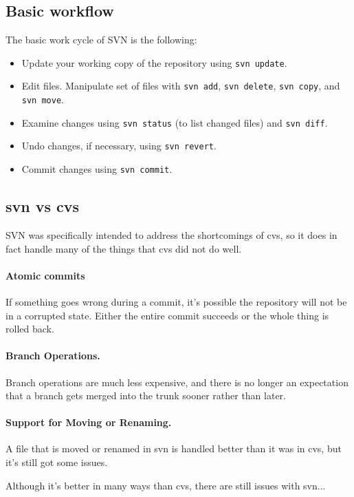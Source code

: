 \subsection*{Basic workflow}
The basic work cycle of SVN is the following:
\begin{itemize}
\item Update your working copy of the repository using {\tt svn update}.
\item Edit files. Manipulate set of files with {\tt svn add}, {\tt svn delete}, {\tt svn copy}, and {\tt svn move}.
\item Examine changes using {\tt svn status} (to list changed files)
  and {\tt svn diff}.
\item Undo changes, if necessary, using {\tt svn revert}.
\item Commit changes using {\tt svn commit}.
\end{itemize}

\subsection*{svn vs cvs}

SVN was specifically intended to address the shortcomings of cvs, so it does in fact handle many of the things that cvs did not do well.

\paragraph{Atomic commits} If something goes wrong during a commit, it's possible the repository will not be in a corrupted state. Either the entire commit succeeds or the whole thing is rolled back.

\paragraph{Branch Operations.} Branch operations are much less expensive, and there is no longer an expectation that a branch gets merged into the trunk sooner rather than later.

\paragraph{Support for Moving or Renaming.} A file that is moved or renamed in svn is handled better than it was in cvs, but it's still got some issues.

Although it's better in many ways than cvs, there are still issues with svn...

